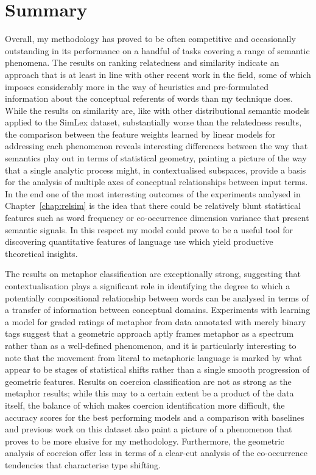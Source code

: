 \section{Summary}
Overall, my methodology has proved to be often competitive and occasionally outstanding in its performance on a handful of tasks covering a range of semantic phenomena.  The results on ranking relatedness and similarity indicate an approach that is at least in line with other recent work in the field, some of which imposes considerably more in the way of heuristics and pre-formulated information about the conceptual referents of words than my technique does.  While the results on similarity are, like with other distributional semantic models applied to the SimLex dataset, substantially worse than the relatedness results, the comparison between the feature weights learned by linear models for addressing each phenomenon reveals interesting differences between the way that semantics play out in terms of statistical geometry, painting a picture of the way that a single analytic process might, in contextualised subspaces, provide a basis for the analysis of multiple axes of conceptual relationships between input terms.  In the end one of the most interesting outcomes of the experiments analysed in Chapter~\ref{chap:relsim} is the idea that there could be relatively blunt statistical features such as word frequency or co-occurrence dimension variance that present semantic signals.  In this respect my model could prove to be a useful tool for discovering quantitative features of language use which yield productive theoretical insights.

The results on metaphor classification are exceptionally strong, suggesting that contextualisation plays a significant role in identifying the degree to which a potentially compositional relationship between words can be analysed in terms of a transfer of information between conceptual domains.  Experiments with learning a model for graded ratings of metaphor from data annotated with merely binary tags suggest that a geometric approach aptly frames metaphor as a spectrum rather than as a well-defined phenomenon, and it is particularly interesting to note that the movement from literal to metaphoric language is marked by what appear to be stages of statistical shifts rather than a single smooth progression of geometric features.  Results on coercion classification are not as strong as the metaphor results; while this may to a certain extent be a product of the data itself, the balance of which makes coercion identification more difficult, the accuracy scores for the best performing models and a comparison with baselines and previous work on this dataset also paint a picture of a phenomenon that proves to be more elusive for my methodology.  Furthermore, the geometric analysis of coercion offer less in terms of a clear-cut analysis of the co-occurrence tendencies that characterise type shifting.

